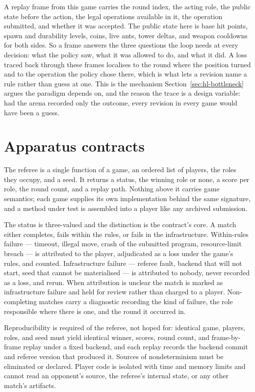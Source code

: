 A replay frame from this game carries the round index, the acting role, the public state
before the action, the legal operations available in it, the operation submitted, and
whether it was accepted. The public state here is base hit points, spawn and durability
levels, coins, live ants, tower deltas, and weapon cooldowns for both sides. So a frame
answers the three questions the loop needs at every decision: what the policy saw, what
it was allowed to do, and what it did. A loss traced back through these frames localises
to the round where the position turned and to the operation the policy chose there,
which is what lets a revision name a rule rather than guess at one. This is the
mechanism Section~\ref{sec:hl-bottleneck} argues the paradigm depends on, and the reason
the trace is a design variable: had the arena recorded only the outcome, every revision
in every game would have been a guess.

\section{Apparatus contracts}
\label{app:apparatus}

The referee is a single function of a game, an ordered list of players, the roles they
occupy, and a seed. It returns a status, the winning role or none, a score per role, the
round count, and a replay path. Nothing above it carries game semantics; each game
supplies its own implementation behind the same signature, and a method under test is
assembled into a player like any archived submission.

The status is three-valued and the distinction is the contract's core. A match either
completes, fails within the rules, or fails in the infrastructure. Within-rules failure
--- timeout, illegal move, crash of the submitted program, resource-limit breach --- is
attributed to the player, adjudicated as a loss under the game's rules, and counted.
Infrastructure failure --- referee fault, backend that will not start, seed that cannot
be materialised --- is attributed to nobody, never recorded as a loss, and rerun. When
attribution is unclear the match is marked as infrastructure failure and held for review
rather than charged to a player. Non-completing matches carry a diagnostic recording the
kind of failure, the role responsible where there is one, and the round it occurred in.

Reproducibility is required of the referee, not hoped for: identical game, players,
roles, and seed must yield identical winner, scores, round count, and frame-by-frame
replay under a fixed backend, and each replay records the backend commit and referee
version that produced it. Sources of nondeterminism must be eliminated or declared.
Player code is isolated with time and memory limits and cannot read an opponent's
source, the referee's internal state, or any other match's artifacts.


